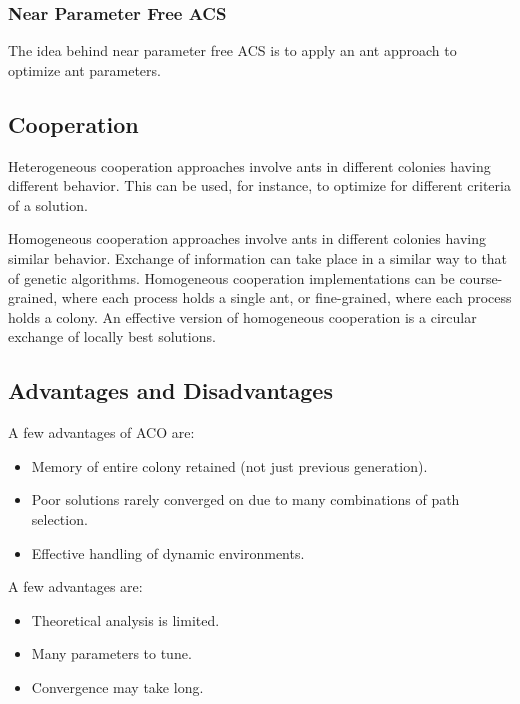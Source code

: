 \documentclass[12pt,titlepage]{article}
\begin{document}
      \subsubsection{Near Parameter Free ACS}
        The idea behind near parameter free ACS is to apply an ant approach to optimize ant parameters.

    \subsection{Cooperation}
      Heterogeneous cooperation approaches involve ants in different colonies having different behavior. This can be used, for instance, to optimize for
      different criteria of a solution.

      Homogeneous cooperation approaches involve ants in different colonies having similar behavior. Exchange of information can take place in a similar
      way to that of genetic algorithms. Homogeneous cooperation implementations can be course-grained, where each process holds a single ant, or
      fine-grained, where each process holds a colony. An effective version of homogeneous cooperation is a circular exchange of locally best solutions.

    \subsection{Advantages and Disadvantages}
      A few advantages of ACO are:
      \begin{itemize}
        \item Memory of entire colony retained (not just previous generation).
        \item Poor solutions rarely converged on due to many combinations of path selection.
        \item Effective handling of dynamic environments.
      \end{itemize}

      A few advantages are:
      \begin{itemize}
        \item Theoretical analysis is limited.
        \item Many parameters to tune.
        \item Convergence may take long.
      \end{itemize}
\end{document}
